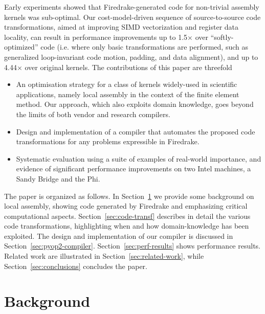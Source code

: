 \documentclass[conference]{IEEEtran}
\begin{document}
Early experiments showed that Firedrake-generated code for non-trivial assembly kernels was sub-optimal. Our cost-model-driven sequence of source-to-source code transformations, aimed at improving SIMD vectorization and register data locality, can result in performance improvements up to 1.5$\times$ over ``softly-optimized'' code (i.e. where only basic transformations are performed, such as generalized loop-invariant code motion, padding, and data alignment), and up to 4.44$\times$ over original kernels. The contributions of this paper are threefold
\begin{itemize}
\item An optimisation strategy for a class of kernels widely-used in scientific applications, namely local assembly in the context of the finite element method. Our approach, which also exploits domain knowledge, goes beyond the limits of both vendor and research compilers.
\item Design and implementation of a compiler that automates the proposed code transformations for any problems expressible in Firedrake.
\item Systematic evaluation using a suite of examples of real-world importance, and evidence of significant performance improvements on two Intel machines, a Sandy Bridge and the Phi.
\end{itemize}

The paper is organized as follows. In Section~\ref{sec:background} we provide some background on local assembly, showing code generated by Firedrake and emphasizing critical computational aspects. Section~\ref{sec:code-transf} describes in detail the various code transformations, highlighting when and how domain-knowledge has been exploited. The design and implementation of our compiler is discussed in Section~\ref{sec:pyop2-compiler}. Section~\ref{sec:perf-results} shows performance results. Related work are illustrated in Section~\ref{sec:related-work}, while Section~\ref{sec:conclusions} concludes the paper.



\section{Background}
\label{sec:background}
\end{document}
